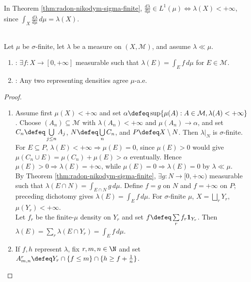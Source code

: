 \begin{remark} \label{rem:rn-derivative-integrability-finiteness} \\
In Theorem \ref{thm:radon-nikodym-sigma-finite}, $\frac{d\lambda}{d\mu}\in L^1(\mu)\Leftrightarrow\lambda(X)<+\infty$, since $\int_X\frac{d\lambda}{d\mu}\,d\mu=\lambda(X)$.
\end{remark}

\begin{theorem} \label{thm:radon-nikodym-extended-dominated-measure} \\
Let $\mu$ be $\sigma$-finite, let $\lambda$ be a measure on $(X,\mathcal{M})$, and assume $\lambda\ll\mu$.
\begin{enumerate}[label=(\roman*)]
\setlength{\itemsep}{0pt}
\item {}: $\exists f:X\to[0,+\infty]$ measurable such that $\lambda(E)=\int_Ef\,d\mu$ for $E\in\mathcal{M}$.
\item {}: Any two representing densities agree $\mu$-a.e.
\end{enumerate}
\begin{proof}
\begin{enumerate}[label=(\roman*)]
\setlength{\itemsep}{0pt}
\item Assume first $\mu(X)<+\infty$ and set $\alpha\defeq\sup\{\mu(A):A\in\mathcal{M},\lambda(A)<+\infty\}$. Choose $(A_n)\subseteq\mathcal{M}$ with $\lambda(A_n)<+\infty$ and $\mu(A_n)\to\alpha$, and set $C_n\defeq\bigcup\limits_{j\leq n}A_j$, $N\defeq\bigcup\limits_nC_n$, and $P\defeq X\setminus N$. Then $\lambda|_N$ is $\sigma$-finite.\\
For $E\subseteq P$, $\lambda(E)<+\infty\Rightarrow\mu(E)=0$, since $\mu(E)>0$ would give $\mu(C_n\cup E)=\mu(C_n)+\mu(E)>\alpha$ eventually. Hence $\mu(E)>0\Rightarrow\lambda(E)=+\infty$, while $\mu(E)=0\Rightarrow\lambda(E)=0$ by $\lambda\ll\mu$.\\
By Theorem \ref{thm:radon-nikodym-sigma-finite}, $\exists g:N\to[0,+\infty)$ measurable such that $\lambda(E\cap N)=\int_{E\cap N}g\,d\mu$. Define $f=g$ on $N$ and $f=+\infty$ on $P$; preceding dichotomy gives $\lambda(E)=\int_Ef\,d\mu$. For $\sigma$-finite $\mu$, $X=\bigsqcup\limits_rY_r$, $\mu(Y_r)<+\infty$.\\
Let $f_r$ be the finite-$\mu$ density on $Y_r$ and set $f\defeq\sum\limits_rf_r\mathbf{1}_{Y_r}$. Then $\lambda(E)=\sum\limits_r\lambda(E\cap Y_r)=\int_Ef\,d\mu$.
\item If $f,h$ represent $\lambda$, fix $r,m,n\in\N$ and set $A_{m,n}^r\defeq Y_r\cap\{f\leq m\}\cap\{h\geq f+\frac{1}{n}\}$.\\

\end{enumerate}
\end{proof}
\end{theorem}
